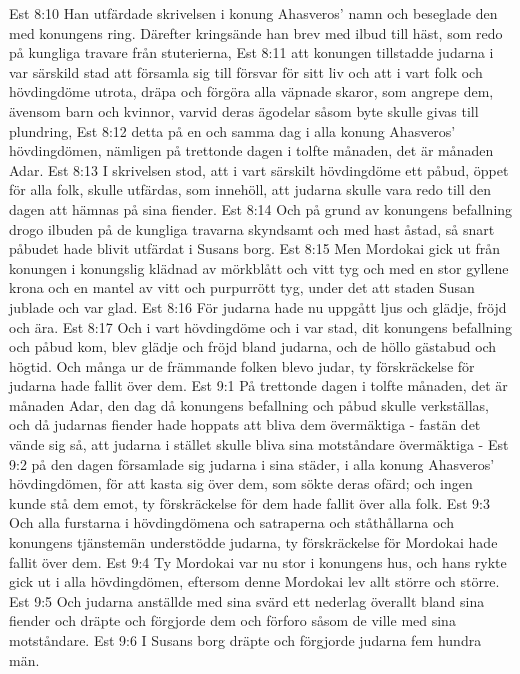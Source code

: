 Est 8:10  Han utfärdade skrivelsen i konung Ahasveros' namn och beseglade den med konungens ring. Därefter kringsände han brev med ilbud till häst, som redo på kungliga travare från stuterierna,
Est 8:11  att konungen tillstadde judarna i var särskild stad att församla sig till försvar för sitt liv och att i vart folk och hövdingdöme utrota, dräpa och förgöra alla väpnade skaror, som angrepe dem, ävensom barn och kvinnor, varvid deras ägodelar såsom byte skulle givas till plundring,
Est 8:12  detta på en och samma dag i alla konung Ahasveros' hövdingdömen, nämligen på trettonde dagen i tolfte månaden, det är månaden Adar.
Est 8:13  I skrivelsen stod, att i vart särskilt hövdingdöme ett påbud, öppet för alla folk, skulle utfärdas, som innehöll, att judarna skulle vara redo till den dagen att hämnas på sina fiender.
Est 8:14  Och på grund av konungens befallning drogo ilbuden på de kungliga travarna skyndsamt och med hast åstad, så snart påbudet hade blivit utfärdat i Susans borg.
Est 8:15  Men Mordokai gick ut från konungen i konungslig klädnad av mörkblått och vitt tyg och med en stor gyllene krona och en mantel av vitt och purpurrött tyg, under det att staden Susan jublade och var glad.
Est 8:16  För judarna hade nu uppgått ljus och glädje, fröjd och ära.
Est 8:17  Och i vart hövdingdöme och i var stad, dit konungens befallning och påbud kom, blev glädje och fröjd bland judarna, och de höllo gästabud och högtid. Och många ur de främmande folken blevo judar, ty förskräckelse för judarna hade fallit över dem.
Est 9:1  På trettonde dagen i tolfte månaden, det är månaden Adar, den dag då konungens befallning och påbud skulle verkställas, och då judarnas fiender hade hoppats att bliva dem övermäktiga - fastän det vände sig så, att judarna i stället skulle bliva sina motståndare övermäktiga -
Est 9:2  på den dagen församlade sig judarna i sina städer, i alla konung Ahasveros' hövdingdömen, för att kasta sig över dem, som sökte deras ofärd; och ingen kunde stå dem emot, ty förskräckelse för dem hade fallit över alla folk.
Est 9:3  Och alla furstarna i hövdingdömena och satraperna och ståthållarna och konungens tjänstemän understödde judarna, ty förskräckelse för Mordokai hade fallit över dem.
Est 9:4  Ty Mordokai var nu stor i konungens hus, och hans rykte gick ut i alla hövdingdömen, eftersom denne Mordokai lev allt större och större.
Est 9:5  Och judarna anställde med sina svärd ett nederlag överallt bland sina fiender och dräpte och förgjorde dem och förforo såsom de ville med sina motståndare.
Est 9:6  I Susans borg dräpte och förgjorde judarna fem hundra män.
